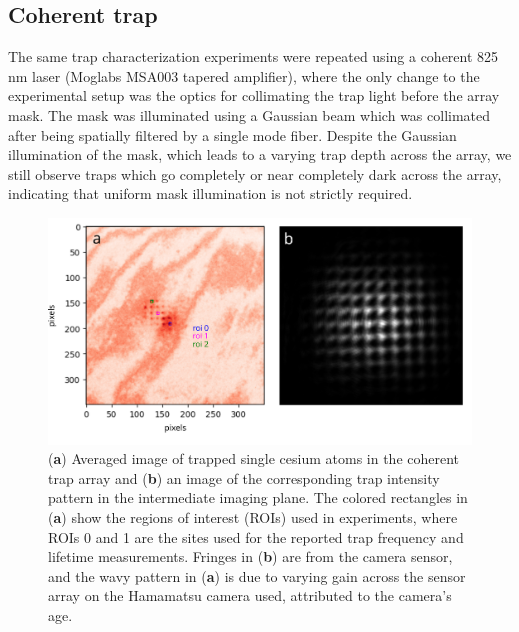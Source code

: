 \subsection{Coherent trap}\label{sub:coherent}
The same trap characterization experiments were repeated using a coherent 825 nm laser (Moglabs MSA003 tapered amplifier), where the only change to the experimental setup was the optics for collimating the trap light before the array mask. The mask was illuminated using a Gaussian beam which was collimated after being spatially filtered by a single mode fiber. Despite the Gaussian illumination of the mask, which leads to a varying trap depth across the array, we still observe traps which go completely or near completely dark across the array, indicating that uniform mask illumination is not  strictly required.

\begin{figure}[h]
    \centering
    \includegraphics[width=\textwidth]{Images/coherent_trap_intensity_and_atoms.pdf}
    \caption{(\textbf{a}) Averaged image of trapped single cesium atoms in the coherent trap array and (\textbf{b}) an image of the corresponding trap intensity pattern in the intermediate imaging plane. The colored rectangles in (\textbf{a}) show the regions of interest (ROIs) used in experiments, where ROIs 0 and 1 are the sites used for the reported trap frequency and lifetime measurements. Fringes in (\textbf{b}) are from the camera sensor, and the wavy pattern in (\textbf{a}) is due to varying gain across the sensor array on the Hamamatsu camera used,  attributed to the camera's age.}
    \label{fig:coherent_trap_and_atoms}
\end{figure}


